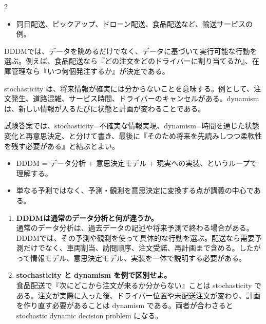 \clearpage
{}
\begin{multicols}{2}\footnotesize\raggedcolumns
{}
\begin{itemize}
\item 同日配送、ピックアップ、ドローン配送、食品配送など、輸送サービスの例。
\end{itemize}
DDDMでは、データを眺めるだけでなく、データに基づいて実行可能な行動を選ぶ。例えば、食品配送なら『どの注文をどのドライバーに割り当てるか』、在庫管理なら『いつ何個発注するか』が決定である。\par

stochasticity は、将来情報が確実には分からないことを意味する。例として、注文発生、道路混雑、サービス時間、ドライバーのキャンセルがある。dynamism は、新しい情報が入るたびに状態と計画が変わることである。\par

試験答案では、stochasticity=不確実な情報実現、dynamism=時間を通じた状態変化と再意思決定、と分けて書き、最後に『そのため将来を先読みしつつ柔軟性を残す必要がある』と結ぶとよい。\par
{}
\begin{itemize}
\item DDDM = データ分析 + 意思決定モデル + 現実への実装、というループで理解する。
\item 単なる予測ではなく、予測・観測を意思決定に変換する点が講義の中心である。
\end{itemize}
\begin{enumerate}
\item \textbf{DDDMは通常のデータ分析と何が違うか。}\\通常のデータ分析は、過去データの記述や将来予測で終わる場合がある。DDDMでは、その予測や観測を使って具体的な行動を選ぶ。配送なら需要予測だけでなく、車両割当、訪問順序、注文受諾、再計画まで含める。したがって情報モデル、意思決定モデル、実装を一体で説明する必要がある。
\item \textbf{stochasticity と dynamism を例で区別せよ。}\\食品配送で『次にどこから注文が来るか分からない』ことは stochasticity である。注文が実際に入った後、ドライバー位置や未配送注文が変わり、計画を作り直す必要があることは dynamism である。両者が合わさると stochastic dynamic decision problem になる。
\end{enumerate}
\end{multicols}

